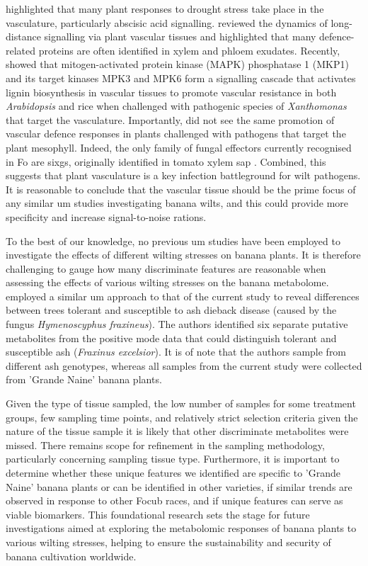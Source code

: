 \textcite{Takahashi2020} highlighted that many plant responses to drought stress take place in the vasculature, particularly abscisic acid signalling. \textcite{Notaguchi2015} reviewed the dynamics of long-distance signalling via plant vascular tissues and highlighted that many defence-related proteins are often identified in xylem and phloem exudates. Recently, \textcite{Lin2022} showed that mitogen-activated protein kinase (MAPK) phosphatase 1 (MKP1) and its target kinases MPK3 and MPK6 form a signalling cascade that activates lignin biosynthesis in vascular tissues to promote vascular resistance in both \textit{Arabidopsis} and rice when challenged with pathogenic species of \textit{Xanthomonas} that target the vasculature. Importantly, \textcite{Lin2022} did not see the same promotion of vascular defence responses in plants challenged with pathogens that target the plant mesophyll. Indeed, the only family of fungal effectors currently recognised in \ac{Fo} are \acfp{sixg}, originally identified in tomato xylem sap \parencite{Houterman2007}. Combined, this suggests that plant vasculature is a key infection battleground for wilt pathogens. It is reasonable to conclude that the vascular tissue should be the prime focus of any similar \ac{um} studies investigating banana wilts, and this could provide more specificity and increase signal-to-noise rations. 

\bigskip
\noindent
To the best of our knowledge, no previous \ac{um} studies have been employed to investigate the effects of different wilting stresses on banana plants. It is therefore challenging to gauge how many discriminate features are reasonable when assessing the effects of various wilting stresses on the banana metabolome. \textcite{Sambles2017} employed a similar \ac{um} approach to that of the current study to reveal differences between trees tolerant and susceptible to ash dieback disease (caused by the fungus \textit{Hymenoscyphus fraxineus}). The authors identified six separate putative metabolites from the positive mode data that could distinguish tolerant and susceptible ash (\textit{Fraxinus excelsior}). It is of note that the authors sample from different ash genotypes, whereas all samples from the current study were collected from 'Grande Naine' banana plants. 

Given the type of tissue sampled, the low number of samples for some treatment groups, few sampling time points, and relatively strict selection criteria given the nature of the tissue sample it is likely that other discriminate metabolites were missed. There remains scope for refinement in the sampling methodology, particularly concerning sampling tissue type. Furthermore, it is important to determine whether these unique features we identified are specific to 'Grande Naine' banana plants or can be identified in other varieties, if similar trends are observed in response to other \ac{Focub} races, and if unique features can serve as viable biomarkers. This foundational research sets the stage for future investigations aimed at exploring the metabolomic responses of banana plants to various wilting stresses, helping to ensure the sustainability and security of banana cultivation worldwide. 

